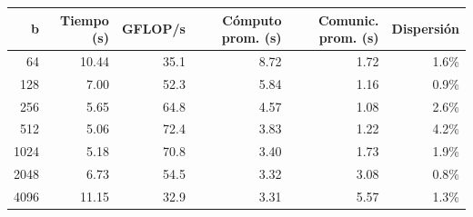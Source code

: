 \begin{tabular}{rrrrrr}
\toprule
b & Tiempo (s) & GFLOP/s & Cómputo prom. (s) & Comunic. prom. (s) & Dispersión \\
\midrule
64 & 10.44 & 35.1 & 8.72 & 1.72 & 1.6\% \\
128 & 7.00 & 52.3 & 5.84 & 1.16 & 0.9\% \\
256 & 5.65 & 64.8 & 4.57 & 1.08 & 2.6\% \\
512 & 5.06 & 72.4 & 3.83 & 1.22 & 4.2\% \\
1024 & 5.18 & 70.8 & 3.40 & 1.73 & 1.9\% \\
2048 & 6.73 & 54.5 & 3.32 & 3.08 & 0.8\% \\
4096 & 11.15 & 32.9 & 3.31 & 5.57 & 1.3\% \\
\bottomrule
\end{tabular}
